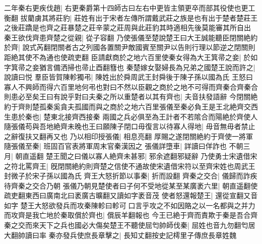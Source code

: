 二年秦右更疾伐趙|{
	右更秦爵第十四師古曰左右中更皆主領更卒而部其役使也更工衡翻
	}
拔藺虜其將莊豹|{
	莊姓有出于宋者左傳所謂戴武莊之族是也有出于楚者楚莊王之後莊蹻是也齊之莊暴楚之莊辛蒙之莊周與此莊豹其時適相先後莫能審其所自出
	}
秦王欲伐齊患齊楚之從親|{
	從子容翻
	}
乃使張儀至楚說楚王曰大王誠能聽臣閉關絶約於齊|{
	說式芮翻閉關者古之列國各置關尹敵國賓至關尹以告則行理以節逆之閉關則距絶其使不為通也使疏吏翻
	}
臣請獻商於之地六百里使秦女得為大王箕帚之妾|{
	於如字箕帚之妾猶言備洒掃也帚止酉翻篲也
	}
秦楚嫁女娶婦長為兄弟之國楚王說而許之|{
	說讀曰悦
	}
羣臣皆賀陳軫獨弔|{
	陳姓出於舜周武王封舜後于陳子孫以國為氏
	}
王怒曰寡人不興師而得六百里地何弔也對曰不然以臣觀之商於之地不可得而齊秦合齊秦合則患必至矣王曰有說乎對曰夫秦之所以重楚者以其有齊也|{
	夫音扶發語辭
	}
今閉關絶約于齊則楚孤秦奚貪夫孤國而與之商於之地六百里張儀至秦必負王是王北絶齊交西生患於秦也|{
	楚東北接齊西接秦
	}
兩國之兵必俱至為王計者不若隂合而陽絶於齊使人隨張儀苟與吾地絶齊未晚也王曰願陳子閉口毋復言以待寡人得地|{
	毋音無毋者禁止之辭復扶又翻再又也
	}
乃以相印授張儀|{
	相息亮翻
	}
厚賜之遂閉關絶約于齊使一將軍隨張儀至秦|{
	班固百官表將軍周末官秦漢因之
	}
張儀詳墮車|{
	詳讀曰佯詐也
	}
不朝三月|{
	朝直遥翻
	}
楚王聞之曰儀以寡人絶齊未甚邪|{
	邪余遮翻邪疑辭
	}
乃使勇士宋遺借宋之符北罵齊王|{
	旣閉關絶約則齊楚之信使不通故使宋遺借宋符以至齊宋姓也周武王封微子於宋子孫以國為氏
	}
齊王大怒折節以事秦|{
	折而設翻
	}
齊秦之交合|{
	儀歸而詐疾待齊秦之交合乃朝
	}
張儀乃朝見楚使者曰子何不受地從某至某廣袤六里|{
	朝直遥翻使疏吏翻東西曰廣南北曰袤廣古曠翻又讀如字袤音茂
	}
使者怒還報楚王|{
	還從宣翻又音如字
	}
楚王大怒欲發兵而攻秦陳軫曰軫可口言乎攻之不如因賂之以一名都與之并力而攻齊是我亡地於秦取償於齊也|{
	償辰羊翻報也
	}
今王已絶于齊而責欺于秦是吾合齊秦之交而來天下之兵也國必大傷矣楚王不聽使屈匄帥師伐秦|{
	屈姓也音九勿翻匄居大翻帥讀曰率
	}
秦亦發兵使庶長章擊之|{
	長知丈翻按史記樗里子傳庶長章姓魏
	}



